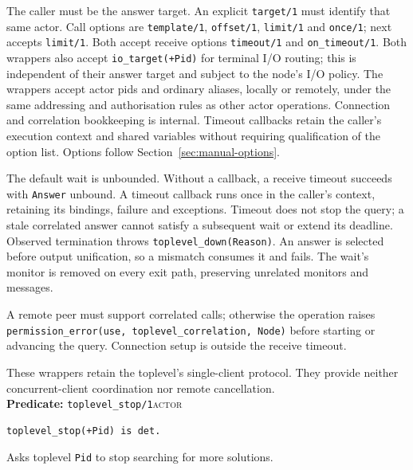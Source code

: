 The caller must be the answer target. An explicit \texttt{target/\allowbreak{}1} must identify that same actor.
Call options are \texttt{template/\allowbreak{}1}, \texttt{offset/\allowbreak{}1}, \texttt{limit/\allowbreak{}1} and \texttt{once/\allowbreak{}1}; next
accepts \texttt{limit/\allowbreak{}1}. Both accept receive options \texttt{timeout/\allowbreak{}1} and \texttt{on\_\allowbreak{}timeout/\allowbreak{}1}.
Both wrappers also accept \texttt{io\_\allowbreak{}target(\allowbreak{}+Pid)} for terminal I/O routing;
this is independent of their answer target and subject to the node's I/O
policy. The wrappers accept actor pids and ordinary aliases, locally or
remotely, under the same addressing and authorisation rules as other actor
operations. Connection and correlation bookkeeping is internal. Timeout
callbacks retain the caller's execution context and shared variables without
requiring qualification of the option list. Options follow
Section~\ref{sec:manual-options}.

The default wait is unbounded. Without a callback, a receive timeout succeeds with \texttt{Answer}
unbound. A timeout callback runs once in the caller's context, retaining its bindings, failure and
exceptions. Timeout does not stop the query; a stale correlated answer cannot satisfy a subsequent
wait or extend its deadline. Observed termination throws \texttt{toplevel\_\allowbreak{}down(\allowbreak{}Reason)}. An answer
is selected before output unification, so a mismatch consumes it and fails. The wait's monitor is
removed on every exit path, preserving unrelated monitors and messages.

A remote peer must support correlated calls; otherwise the operation raises
\texttt{permission\_\allowbreak{}error(\allowbreak{}use,\allowbreak{} toplevel\_\allowbreak{}correlation,\allowbreak{} Node)} before starting
or advancing the query. Connection setup is outside the receive timeout.

These wrappers retain the toplevel's single-client protocol. They provide neither concurrent-client
coordination nor remote cancellation.\\


\noindent \textbf{Predicate:} \texttt{toplevel\_\allowbreak{}stop/\allowbreak{}1}\hfill\textsc{actor}

\begin{verbatim}
toplevel_stop(+Pid) is det.
\end{verbatim}

\noindent Asks toplevel \texttt{Pid} to stop searching for more solutions.\\


